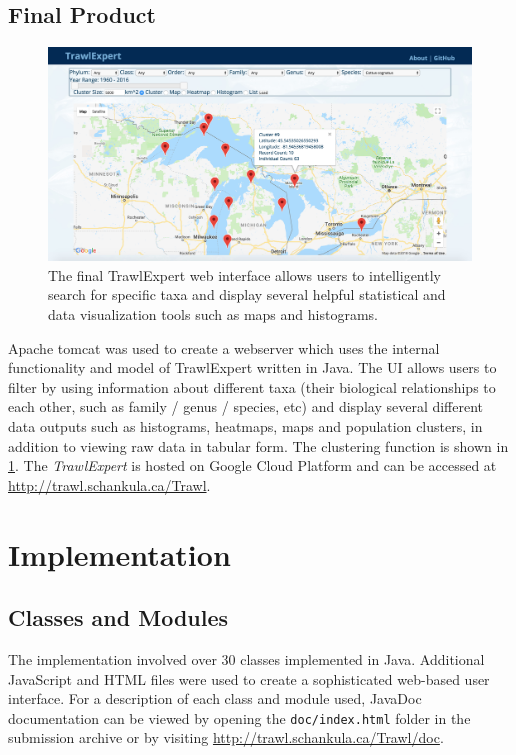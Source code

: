 \documentclass{article}
\begin{document}
\subsection{Final Product}
\begin{figure}
\centering
\includegraphics[width=16cm]{UI.png}
\caption{The final TrawlExpert web interface allows users to intelligently search for specific taxa and display several helpful statistical and data visualization tools such as maps and histograms.}
\label{fig:UI}
\end{figure}

Apache tomcat was used to create a webserver which uses the internal functionality and model of TrawlExpert written in Java. The UI allows users to filter by using information about different taxa (their biological relationships to each other, such as family / genus / species, etc) and display several different data outputs such as histograms, heatmaps, maps and population clusters, in addition to viewing raw data in tabular form. The clustering function is shown in \ref{fig:UI}. The \textit{TrawlExpert} is hosted on Google Cloud Platform and can be accessed at \url{http://trawl.schankula.ca/Trawl}. 


\section{Implementation}
\subsection{Classes and Modules}
The implementation involved over 30 classes implemented in Java. Additional JavaScript and HTML files were used to create a sophisticated web-based user interface. For a description of each class and module used, JavaDoc documentation can be viewed by opening the \texttt{doc/index.html} folder in the submission archive or by visiting \url{http://trawl.schankula.ca/Trawl/doc}.
\end{document}
